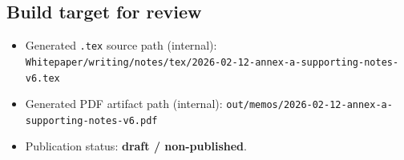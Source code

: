 \documentclass[
]{article}
\providecommand{\tightlist}{%
  \setlength{\itemsep}{0pt}\setlength{\parskip}{0pt}}
\begin{document}
\hypertarget{build-target-for-review}{%
\subsection{Build target for review}\label{build-target-for-review}}

\begin{itemize}
\tightlist
\item
  Generated \texttt{.tex} source path (internal):
  \texttt{Whitepaper/writing/notes/tex/2026-02-12-annex-a-supporting-notes-v6.tex}
\item
  Generated PDF artifact path (internal):
  \texttt{out/memos/2026-02-12-annex-a-supporting-notes-v6.pdf}
\item
  Publication status: \textbf{draft / non-published}.
\end{itemize}
\end{document}
